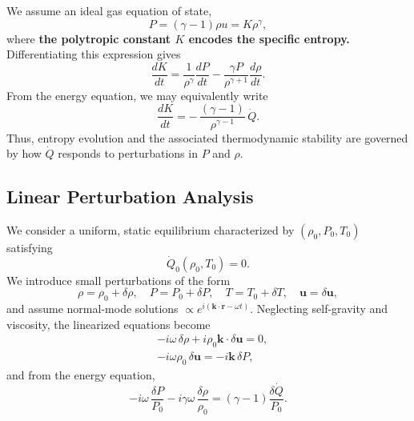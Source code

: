 We assume an ideal gas equation of state,
\begin{equation}
P = (\gamma - 1)\rho u = K\rho^{\gamma},
\end{equation}
where \textbf{the polytropic constant $K$ encodes the specific entropy.  }
Differentiating this expression gives
\begin{equation}
\frac{dK}{dt}
= \frac{1}{\rho^{\gamma}}
\frac{dP}{dt} - \frac{\gamma P}{\rho^{\gamma+1}}\frac{d\rho}{dt}.
\end{equation}
From the energy equation, we may equivalently write
\begin{equation}
\label{eq:dKdt_TI}
\frac{dK}{dt} = -\,\frac{(\gamma - 1)}{\rho^{\gamma - 1}}\,\dot{Q}.
\end{equation}
Thus, entropy evolution and the associated thermodynamic stability are governed by how $\dot{Q}$ responds to perturbations in $P$ and $\rho$.

\subsection*{Linear Perturbation Analysis}

We consider a uniform, static equilibrium characterized by $(\rho_0, P_0, T_0)$ satisfying
\[
\dot{Q}_0(\rho_0, T_0) = 0.
\]
We introduce small perturbations of the form
\begin{equation}
\rho = \rho_0 + \delta\rho, 
\quad 
P = P_0 + \delta P, 
\quad
T = T_0 + \delta T,
\quad
\mathbf{u} = \delta\mathbf{u},
\end{equation}
and assume normal-mode solutions $\propto e^{i(\mathbf{k}\cdot\mathbf{r} - \omega t)}$.  
Neglecting self-gravity and viscosity, the linearized equations become
\begin{align}
&-i\omega\,\delta\rho + i\rho_0 \mathbf{k}\!\cdot\!\delta\mathbf{u} = 0, \label{eq:lin_cont_TI}\\[3pt]
&-i\omega\rho_0\,\delta\mathbf{u} = -i\mathbf{k}\,\delta P, \label{eq:lin_mom_TI}
\end{align}
and from the energy equation,
\begin{equation}
-i\omega\,\frac{\delta P}{P_0}
- i\gamma\omega\,\frac{\delta\rho}{\rho_0}
= (\gamma - 1)\frac{\delta\dot{Q}}{P_0}.
\label{eq:lin_energy_TI}
\end{equation}

